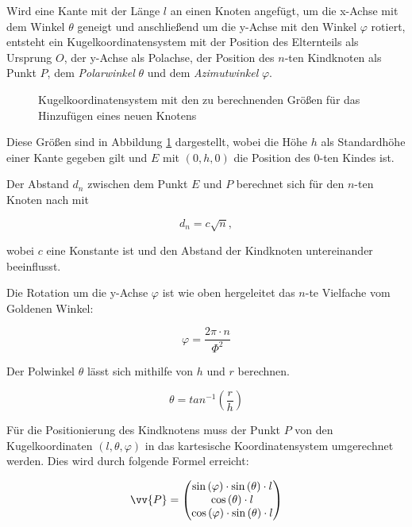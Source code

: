 Wird eine Kante mit der Länge $l$ an einen Knoten angefügt, um die x-Achse mit dem Winkel $\theta$ geneigt und anschließend um die y-Achse mit den Winkel $\varphi$ rotiert, entsteht ein Kugelkoordinatensystem mit der Position des Elternteils als Ursprung $O$, der y-Achse als Polachse, der Position des $n$-ten Kindknoten als Punkt $P$, dem \emph{Polarwinkel} $\theta$ und dem \emph{Azimutwinkel} $\varphi$\cite{papula2001mathematik}.

\begin{figure}[htb]
  
  \caption{Kugelkoordinatensystem mit den zu berechnenden Größen für das Hinzufügen eines neuen Knotens}
  \label{fig:spherical-coordinates}
\end{figure}

Diese Größen sind in Abbildung \ref{fig:spherical-coordinates} dargestellt, wobei die Höhe $h$ als Standardhöhe einer Kante gegeben gilt und $E$ mit $(0, h, 0)$ die Position des $0$-ten Kindes ist.

Der Abstand $d_n$ zwischen dem Punkt $E$ und $P$ berechnet sich für den $n$-ten Knoten nach \cite{vogel1979better} mit

\begin{equation}
\label{eq:r}
  d_n = c \sqrt{n},
\end{equation}

wobei $c$ eine Konstante ist und den Abstand der Kindknoten untereinander beeinflusst.

Die Rotation um die y-Achse $\varphi$ ist wie oben hergeleitet das $n$-te Vielfache vom Goldenen Winkel:

\begin{equation}
  \varphi = \frac{2\pi \cdot n}{\Phi^{2}}
\end{equation}

Der Polwinkel $\theta$ lässt sich mithilfe von $h$ und $r$ berechnen.

\begin{equation}
  \theta = tan^{-1} \left(\frac{r}{h}\right)
\end{equation}

Für die Positionierung des Kindknotens muss der Punkt $P$ von den Kugelkoordinaten $(l, \theta, \varphi)$ in das kartesische Koordinatensystem umgerechnet werden. Dies wird durch folgende Formel erreicht:

\begin{equation}
  \vv{P} = 
  \begin{pmatrix}
    \sin\left(\varphi\right) \cdot \sin\left(\theta\right) \cdot l\\
    \cos\left(\theta\right) \cdot l\\
    \cos\left(\varphi\right) \cdot \sin\left(\theta\right) \cdot l
  \end{pmatrix}
\end{equation}

